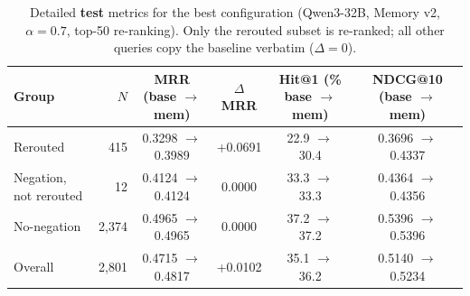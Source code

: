 \begin{table}[t]
\caption{Detailed \textbf{test} metrics for the best configuration
(Qwen3-32B, Memory v2, $\alpha = 0.7$, top-50 re-ranking).
Only the rerouted subset is re-ranked; all other queries copy the baseline verbatim
($\Delta = 0$).}
\label{tab:detail}
\centering
\small
\begin{tabular}{l r cccc}
\toprule
Group                  & $N$ & MRR (base $\to$ mem)  & $\Delta$MRR & Hit@1 (\% base $\to$ mem) & NDCG@10 (base $\to$ mem) \\
\midrule
Rerouted               & 415  & 0.3298 $\to$ 0.3989  & +0.0691     & 22.9 $\to$ 30.4   & 0.3696 $\to$ 0.4337 \\
Negation, not rerouted & 12   & 0.4124 $\to$ 0.4124  & 0.0000      & 33.3 $\to$ 33.3   & 0.4364 $\to$ 0.4356 \\
No-negation            & 2{,}374 & 0.4965 $\to$ 0.4965 & 0.0000   & 37.2 $\to$ 37.2   & 0.5396 $\to$ 0.5396 \\
\midrule
Overall                & 2{,}801 & 0.4715 $\to$ 0.4817 & +0.0102  & 35.1 $\to$ 36.2   & 0.5140 $\to$ 0.5234 \\
\bottomrule
\end{tabular}
\end{table}
